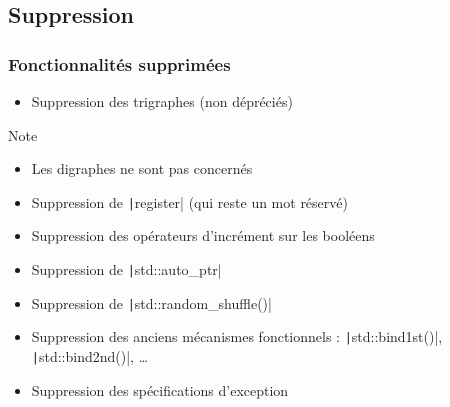 \documentclass[C++.tex]{subfiles}
\begin{document}
\subsection*{Suppression}
\begin{frame}[fragile]
	\frametitle{Fonctionnalités supprimées}
	\begin{itemize}
		\item Suppression des trigraphes (non dépréciés)
	\end{itemize}

	\begin{block}{Note}
		\begin{itemize}
			\item Les digraphes ne sont pas concernés
		\end{itemize}
	\end{block}

	\begin{itemize}
		\item Suppression de \texttt|register| (qui reste un mot réservé)
		\item Suppression des opérateurs d'incrément sur les booléens


		\item Suppression de \texttt|std::auto_ptr|
		\item Suppression de \texttt|std::random_shuffle()|
		\item Suppression des anciens mécanismes fonctionnels : \texttt|std::bind1st()|, \texttt|std::bind2nd()|, \ldots{}
		\item Suppression des spécifications d'exception
	\end{itemize}
\end{frame}
\end{document}
